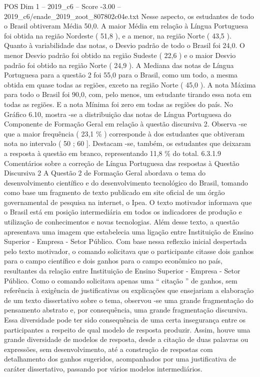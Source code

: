 \begin{textsample}{POS Dim 1 – 2019\_c6 – Score -3.00 – 2019\_c6/enade\_2019\_zoot\_807802c04e.txt}
Nesse aspecto, os estudantes de todo o Brasil obtiveram Média 50,0.
A maior Média em relação à Língua Portuguesa foi obtida na região Nordeste ( 51,8 ), e a menor, na região Norte ( 43,5 ).
Quanto à variabilidade das notas, o Desvio padrão de todo o Brasil foi 24,0.
O menor Desvio padrão foi obtido na região Sudeste ( 22,6 ) e o maior Desvio padrão foi obtido na região Norte ( 24,9 ).
A Mediana das notas de Língua Portuguesa para a questão 2 foi 55,0 para o Brasil, como um todo, a mesma obtida em quase todas as regiões, exceto na região Norte ( 45,0 ).
A nota Máxima para todo o Brasil foi 90,0, com, pelo menos, um estudante tirando essa nota em todas as regiões.
E a nota Mínima foi zero em todas as regiões do país.
No Gráfico 6.10, mostra -se a distribuição das notas de Língua Portuguesa do Componente de Formação Geral em relação à questão discursiva 2.
Observa -se que a maior frequência ( 23,1 \% ) corresponde à dos estudantes que obtiveram nota no intervalo ( 50 ; 60 ].
Destacam -se, também, os estudantes que deixaram a resposta à questão em branco, representando 11,8 \% do total. 6.3.1.9 Comentários sobre a correção de Língua Portuguesa das respostas à Questão Discursiva 2 A Questão 2 de Formação Geral abordava o tema do desenvolvimento científico e do desenvolvimento tecnológico do Brasil, tomando como base um fragmento de texto publicado em site oficial de um órgão governamental de pesquisa na internet, o Ipea.
O texto motivador informava que o Brasil está em posição intermediária em todos os indicadores de produção e utilização de conhecimentos e novas tecnologias.
Além desse texto, a questão apresentava uma imagem que estabelecia uma ligação entre Instituição de Ensino Superior - Empresa - Setor Público.
Com base nessa reflexão inicial despertada pelo texto motivador, o comando solicitava que o participante citasse dois ganhos para o campo científico e dois ganhos para o campo econômico no país, resultantes da relação entre Instituição de Ensino Superior - Empresa - Setor Público.
Como o comando solicitava apenas uma “ citação ” de ganhos, sem referência à exigência de justificativas ou explicações que ensejariam a elaboração de um texto dissertativo sobre o tema, observou -se uma grande fragmentação do pensamento abstrato e, por consequência, uma grande fragmentação discursiva.
Essa diversidade pode ter sido consequência de uma certa insegurança entre os participantes a respeito de qual modelo de resposta produzir.
Assim, houve uma grande diversidade de modelos de resposta, desde a citação de duas palavras ou expressões, sem desenvolvimento, até a construção de respostas com detalhamento dos ganhos sugeridos, acompanhados por uma justificativa de caráter dissertativo, passando por vários modelos intermediários.

\end{textsample}
